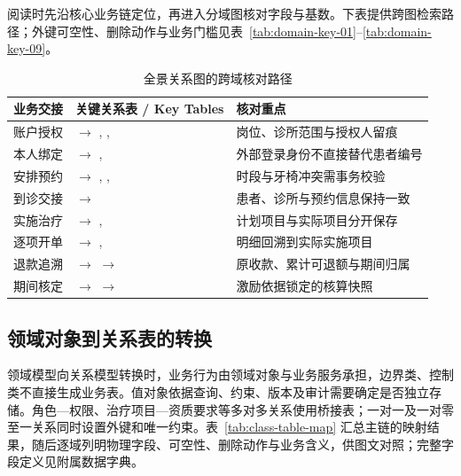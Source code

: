 \documentclass[12pt,a4paper,fontset=windows]{ctexart}
\begin{document}
\noindent{}阅读时先沿核心业务链定位，再进入分域图核对字段与基数。下表提供跨图检索路径；外键可空性、删除动作与业务门槛见表~\ref{tab:domain-key-01}--\ref{tab:domain-key-09}。
\begin{table}[H]\centering\small
\caption{全景关系图的跨域核对路径}\label{tab:erd-cross-domain-paths}
\begin{tabular}{@{}L{27mm}L{72mm}L{50mm}@{}}\toprule
业务交接 & 关键关系表 / Key Tables & 核对重点\\\midrule
账户授权 &  $\to$ , ,  & 岗位、诊所范围与授权人留痕\\
本人绑定 &  $\to$ ,  & 外部登录身份不直接替代患者编号\\
安排预约 &  $\to$ , ,  & 时段与牙椅冲突需事务校验\\
到诊交接 &  $\to$  & 患者、诊所与预约信息保持一致\\
实施治疗 &  $\to$ ,  & 计划项目与实际项目分开保存\\
逐项开单 &  $\to$ ,  & 明细回溯到实际实施项目\\
退款追溯 &  $\to$  $\to$  & 原收款、累计可退额与期间归属\\
期间核定 &  $\to$  $\to$  & 激励依据锁定的核算快照\\
\bottomrule\end{tabular}\end{table}



\subsection{领域对象到关系表的转换}
领域模型向关系模型转换时，业务行为由领域对象与业务服务承担，边界类、控制类不直接生成业务表。值对象依据查询、约束、版本及审计需要确定是否独立存储。角色—权限、治疗项目—资质要求等多对多关系使用桥接表；一对一及一对零至一关系同时设置外键和唯一约束。表~\ref{tab:class-table-map} 汇总主链的映射结果，随后逐域列明物理字段、可空性、删除动作与业务含义，供图文对照；完整字段定义见附属数据字典。
\end{document}
